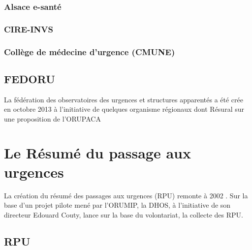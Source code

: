 \documentclass[12pt,english,french,twoside]{report}\usepackage[]{graphicx}\usepackage[]{color}
\begin{document}
  \subsection*{Alsace e-santé}
    
  \subsection*{CIRE-INVS}
    
  \subsection*{Collège de médecine d'urgence (CMUNE)}

\section*{FEDORU}
  
La fédération des observatoires des urgences et structures apparentés a été crée en octobre 2013 à l'initiative de quelques organisme régionaux dont Résural sur une proposition de l'ORUPACA 


\newpage
\chapter{Le Résumé du passage aux urgences}


La création du résumé des passages aux urgences (RPU) remonte à 2002 \cite{11}. Sur la base d'un projet pilote mené par l'ORUMIP, la DHOS, à l'initiative de son directeur Edouard Couty, lance sur la base du volontariat, la collecte des RPU.

\section*{RPU}
\end{document}
